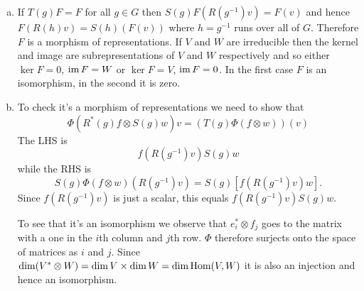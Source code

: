 \documentclass[12pt]{article}
\begin{document}
\begin{answer}
\begin{enumerate}[(a)]
\item If $T(g)F=F$ for all $g\in G$ then $S(g)F(R(g^{-1})v)=F(v)$ and hence $F(R(h)v)=S(h)(F(v))$ where $h=g^{-1}$ runs over all of $G$. Therefore $F$ is a morphism of representations. If $V$ and $W$ are irreducible then the kernel and image are subrepresentations of $V$ and $W$ respectively and so either $\ker F=0$, $\operatorname{im} F=W$ or $\ker F=V$, $\operatorname{im} F=0$. In the first case $F$ is an isomorphism, in the second it is zero.
\item To check it's a morphism of representations we need to show that
\[\Phi(R^*(g)f\otimes S(g)w)v=(T(g)\Phi(f\otimes w))(v)\]
The LHS is
\[f(R(g^{-1})v)S(g)w\]
while the RHS is
\[S(g)\Phi(f\otimes w)(R(g^{-1})v)=S(g)[f(R(g^{-1})v)w].\]
Since $f(R(g^{-1})v)$ is just a scalar, this equals $f(R(g^{-1})v)S(g)w$.

To see that it's an isomorphism we observe that $e_i^*\otimes f_j$ goes to the matrix with a one in the $i$th column and $j$th row. $\Phi$ therefore surjects onto the space of matrices as $i$ and $j$. Since $\dim(V^*\otimes W)=\dim V\times \dim W=\dim\operatorname{Hom}(V,W)$ it is also an injection and hence an isomorphism.
\end{enumerate}
\end{answer}
\end{document}
